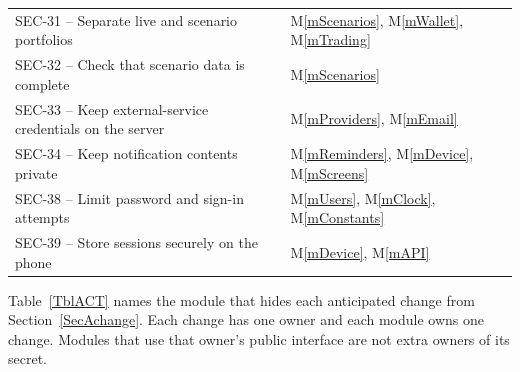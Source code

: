 \documentclass[12pt, titlepage]{article}
\newcommand{\mref}[1]{M\ref{#1}}
\begin{document}
\begin{longtable}{@{}p{}p{}@{}}
SEC-31 -- Separate live and scenario portfolios & \mref{mScenarios}, \mref{mWallet}, \mref{mTrading}\\ %
SEC-32 -- Check that scenario data is complete & \mref{mScenarios}\\ %
SEC-33 -- Keep external-service credentials on the server & \mref{mProviders}, \mref{mEmail}\\ %
SEC-34 -- Keep notification contents private & \mref{mReminders}, \mref{mDevice}, \mref{mScreens}\\ %
SEC-38 -- Limit password and sign-in attempts & \mref{mUsers}, \mref{mClock}, \mref{mConstants}\\ %
SEC-39 -- Store sessions securely on the phone & \mref{mDevice}, \mref{mAPI}\\ %
\end{longtable}
\endgroup

\newpage
Table~\ref{TblACT} names the module that hides each anticipated change from
Section~\ref{SecAchange}. Each change has one owner and each module owns one
change. Modules that use that owner's public interface are not extra owners
of its secret.
\end{document}
